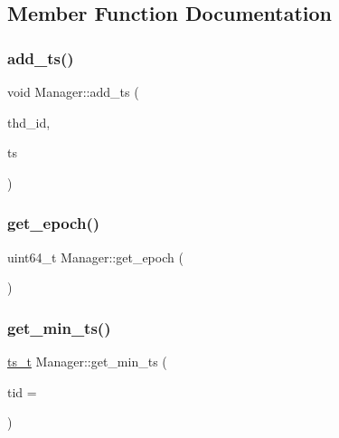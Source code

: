\subsection{Member Function Documentation}
\mbox{\label{classManager_a38f950d2922952fe93425db9e627a873}} 
\subsubsection{\texorpdfstring{add\+\_\+ts()}{add\_ts()}}
{\footnotesize\ttfamily void Manager\+::add\+\_\+ts (\begin{DoxyParamCaption}\item[{uint64\+\_\+t}]{thd\+\_\+id,  }\item[{\hyperlink{global_8h_aaf095dfc9b10f757c968fe146ad7e724}{ts\+\_\+t}}]{ts }\end{DoxyParamCaption})}

\mbox{\label{classManager_a397c36cac2730af19ba1835b7886661a}} 
\subsubsection{\texorpdfstring{get\+\_\+epoch()}{get\_epoch()}}
{\footnotesize\ttfamily uint64\+\_\+t Manager\+::get\+\_\+epoch (\begin{DoxyParamCaption}{ }\end{DoxyParamCaption})\hspace{0.3cm}{\ttfamily [inline]}}

\mbox{\label{classManager_a7a4b0edad70dc91abe7ddcc49fc7ed77}} 
\subsubsection{\texorpdfstring{get\+\_\+min\+\_\+ts()}{get\_min\_ts()}}
{\footnotesize\ttfamily \hyperlink{global_8h_aaf095dfc9b10f757c968fe146ad7e724}{ts\+\_\+t} Manager\+::get\+\_\+min\+\_\+ts (\begin{DoxyParamCaption}\item[{uint64\+\_\+t}]{tid = {} }\end{DoxyParamCaption})}

